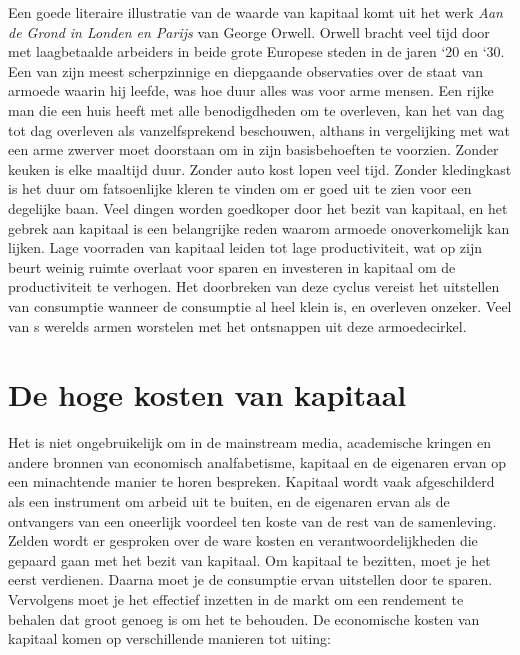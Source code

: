 Een goede literaire illustratie van de waarde van kapitaal komt uit het werk \emph{Aan de Grond in Londen en Parijs} van George Orwell. \autocite{63} Orwell bracht veel tijd door met laagbetaalde arbeiders in beide grote Europese steden in de jaren `20 en `30. Een van zijn meest scherpzinnige en diepgaande observaties over de staat van armoede waarin hij leefde, was hoe duur alles was voor arme mensen. Een rijke man die een huis heeft met alle benodigdheden om te overleven, kan het van dag tot dag overleven als vanzelfsprekend beschouwen, althans in vergelijking met wat een arme zwerver moet doorstaan om in zijn basisbehoeften te voorzien. Zonder keuken is elke maaltijd duur. Zonder auto kost lopen veel tijd. Zonder kledingkast is het duur om fatsoenlijke kleren te vinden om er goed uit te zien voor een degelijke baan. Veel dingen worden goedkoper door het bezit van kapitaal, en het gebrek aan kapitaal is een belangrijke reden waarom armoede onoverkomelijk kan lijken. Lage voorraden van kapitaal leiden tot lage productiviteit, wat op zijn beurt weinig ruimte overlaat voor sparen en investeren in kapitaal om de productiviteit te verhogen. Het doorbreken van deze cyclus vereist het uitstellen van consumptie wanneer de consumptie al heel klein is, en overleven onzeker. Veel van \textquotesingle s werelds armen worstelen met het ontsnappen uit deze armoedecirkel.

\hypertarget{de-hoge-kosten-van-kapitaal}{%
\section{De hoge kosten van kapitaal}\label{de-hoge-kosten-van-kapitaal}}

Het is niet ongebruikelijk om in de mainstream media, academische kringen en andere bronnen van economisch analfabetisme, kapitaal en de eigenaren ervan op een minachtende manier te horen bespreken. Kapitaal wordt vaak afgeschilderd als een instrument om arbeid uit te buiten, en de eigenaren ervan als de ontvangers van een oneerlijk voordeel ten koste van de rest van de samenleving. Zelden wordt er gesproken over de ware kosten en verantwoordelijkheden die gepaard gaan met het bezit van kapitaal. Om kapitaal te bezitten, moet je het eerst verdienen. Daarna moet je de consumptie ervan uitstellen door te sparen. Vervolgens moet je het effectief inzetten in de markt om een rendement te behalen dat groot genoeg is om het te behouden. De economische kosten van kapitaal komen op verschillende manieren tot uiting:

